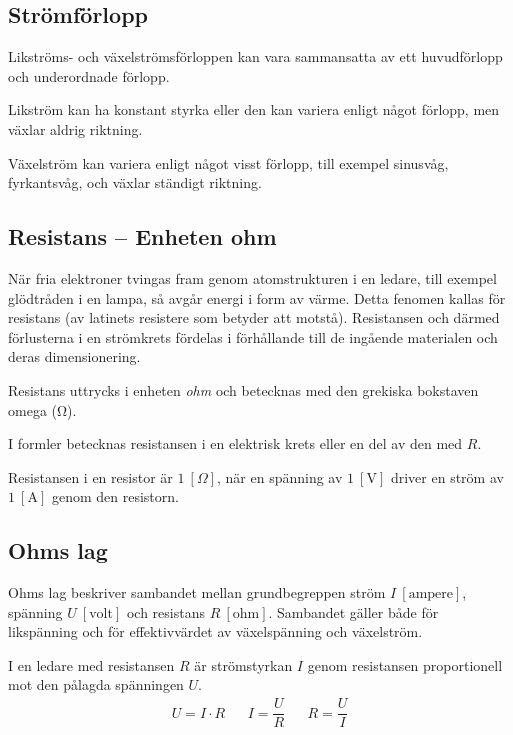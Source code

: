 \subsection{Strömförlopp}
\frdjp
{}

Likströms- och växelströmsförloppen kan vara sammansatta av ett huvudförlopp och
underordnade förlopp.

Likström kan ha konstant styrka eller den kan variera enligt något förlopp, men
växlar aldrig riktning.

Växelström kan variera enligt något visst förlopp, till exempel sinusvåg,
fyrkantsvåg, och växlar ständigt riktning.

\subsection{Resistans -- Enheten ohm}
\label{resistans}

När fria elektroner tvingas fram genom atomstrukturen i en ledare, till exempel
glödtråden i en lampa, så avgår energi i form av värme.
Detta fenomen kallas för resistans (av latinets resistere som betyder att
motstå).
Resistansen och därmed förlusterna i en strömkrets fördelas i
förhållande till de ingående materialen och deras dimensionering.

Resistans uttrycks i enheten \emph{ohm} \cite{SIbrochure8} och betecknas med
den grekiska bokstaven omega (\si{\ohm}).

I formler betecknas resistansen i en elektrisk krets eller en del av den med
\(R\).

Resistansen i en resistor är \(1\ [\Omega]\), när en spänning av \(1\ \mathrm{[V]}\)
driver en ström av \(1\ \mathrm{[A]}\) genom den resistorn.

\subsection{Ohms lag}
\label{ohms_lag}

Ohms lag beskriver sambandet mellan grundbegreppen ström
\(I\ \mathrm{[ampere]}\), spänning \(U\ \mathrm{[volt]}\) och resistans
\(R\ \mathrm{[ohm]}\).
Sambandet gäller både för likspänning och för effektivvärdet av växelspänning och
växelström.

I en ledare med resistansen \(R\) är strömstyrkan \(I\) genom resistansen
proportionell mot den pålagda spänningen \(U\).
\[
\begin{array}{lllll}U=I \cdot R & & I=\dfrac{U}{R} & & R=\dfrac{U}{I}\end{array}
\]
